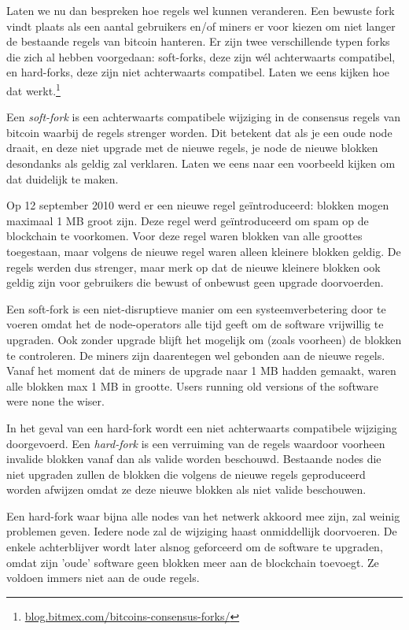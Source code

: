Laten we nu dan bespreken hoe regels wel kunnen veranderen. Een bewuste fork vindt plaats als een aantal gebruikers en/of miners er voor kiezen om niet langer de bestaande regels van bitcoin hanteren. Er zijn twee verschillende typen forks die zich al hebben voorgedaan: soft-forks, deze zijn wél achterwaarts compatibel, en hard-forks, deze zijn niet achterwaarts compatibel. Laten we eens kijken hoe dat werkt.\footnote{\href{https://blog.bitmex.com/bitcoins-consensus-forks/}{blog.bitmex.com/bitcoins-consensus-forks/}}  


Een \textit{soft-fork} is een achterwaarts compatibele wijziging in de consensus regels van bitcoin waarbij de regels strenger worden. Dit betekent dat als je een oude node draait, en deze niet upgrade met de nieuwe regels, je node de nieuwe blokken desondanks als geldig zal verklaren. Laten we eens naar een voorbeeld kijken om dat duidelijk te maken.

Op 12 september 2010 werd er een nieuwe regel geïntroduceerd: blokken mogen maximaal 1 MB groot zijn. Deze regel werd geïntroduceerd om spam op de blockchain te voorkomen. Voor deze regel waren blokken van alle groottes toegestaan, maar volgens de nieuwe regel waren alleen kleinere blokken geldig. De regels werden dus strenger, maar merk op dat de nieuwe kleinere blokken ook geldig zijn voor gebruikers die bewust of onbewust geen upgrade doorvoerden. 

Een soft-fork is een niet-disruptieve manier om een systeemverbetering door te voeren omdat het de node-operators alle tijd geeft om de software vrijwillig te upgraden. Ook zonder upgrade blijft het mogelijk om (zoals voorheen) de blokken te controleren. De miners zijn daarentegen wel gebonden aan de nieuwe regels. Vanaf het moment dat de miners de upgrade naar 1 MB hadden gemaakt, waren alle blokken max 1 MB in grootte. Users running old versions of the software
were none the wiser. 

In het geval van een hard-fork wordt een niet achterwaarts compatibele wijziging doorgevoerd. Een \textit{hard-fork} is een verruiming van de regels waardoor voorheen invalide blokken vanaf dan als valide worden beschouwd. Bestaande nodes die niet upgraden zullen de blokken die volgens de nieuwe regels geproduceerd worden afwijzen omdat ze deze nieuwe blokken als niet valide beschouwen. 

Een hard-fork waar bijna alle nodes van het netwerk akkoord mee zijn,  zal weinig problemen geven. Iedere node zal de wijziging haast onmiddellijk doorvoeren. De enkele achterblijver wordt later alsnog geforceerd om de software te upgraden, omdat zijn 'oude' software geen blokken meer aan de blockchain toevoegt. Ze voldoen immers niet aan de oude regels.


